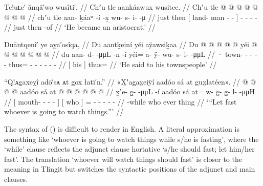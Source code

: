 \ex\label{ex:100-211-became-aristocrat}%
%
\begingl
	\glpreamble	Tc!uʟe′ ānqā′wo wusîti′. //
	\glpreamble	Chʼu tle aanḵáawux̱ wusitee. //
	\gla	Chʼu tle {}  @ {} @ {} @ {} {} 
		 @ {} @ {} @ {} @ {} @ {} //
	\glb	chʼu tle {} aan- ḵáaʷ -í -x̱ {} 
		wu- s- i-  -μ //
	\glc	just then {}[ land- man - - {}]
		- - -  - //
	\gld	just then {}  {} {} -of {} 
		 {} {} {} {} {} //
	\glft	‘He became an aristocrat.’
		//
\endgl
\xe

\ex\label{ex:100-212-said-to-his-townspeople}%
%
\begingl
	\glpreamble	Duāntqenî′ ye aỵa′osîqa, //
	\glpreamble	Du aantḵeiní yéi aÿawsiḵaa //
	\gla	{} Du  @ {} @ {} @ {} @ {} @ {} {}
		yéi @  @ {} @ {} @ {} @ {} @ {} @ {} //
	\glb	{} du aan- d-  -μμL -n -í {}
		yéi= a- ÿ- wu- s- i-  -μμL //
	\glc	{} · town- -  - - - {}
		thus= - - - - -  - //
	\gld	{}[ his  {} {} {} {} {} {}]
		thus=  {} {} {} {} {} //
	\glft	‘He said to his townspeople’
		//
\endgl
\xe

\ex\label{ex:100-213-said-to-his-townspeople}%
%
\begingl
	\glpreamble	“Q!ᴀg̣axeỵî adō′sᴀ ᴀt g̣ox łatī′n.” //
	\glpreamble	«\!X̱ʼag̱ax̱eiÿí aadóo sá at gux̱latéen\!». //
	\gla	{}  @ {} @ {} @ {} @ {} {}
		{} aadóo sá {}
		at @  @ {} @ {} @ {} @ {} @ {} //
	\glb	{} x̱ʼe- g̱-  -μμL -í {}
		{} aadóo sá {}
		at= w- g- g̱- l-  -μμH //
	\glc	{}[ mouth- -  - - {}]
		{}[ who  {}]
		= - - - -  - //
	\gld	{}  {} {} {} -while {}
		{} who ever {}
		thing  {} {} {} {} {} //
	\glft	‘“Let fast whoever is going to watch things.”’
		//
\endgl
\xe

The syntax of (\lastx) is difficult to render in English.
A literal approximation is something like ‘whoever is going to watch things while s/he is fasting’, where the ‘while’ clause reflects the adjunct clause hortative  ‘s/he should fast; let him/her fast’.
The translation ‘whoever will watch things should fast’ is closer to the meaning in Tlingit but switches the syntactic positions of the adjunct and main clauses.

